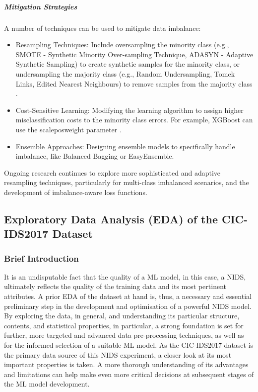 \subparagraph{Mitigation Strategies} 
A number of techniques can be used to mitigate data imbalance:
\begin{itemize}[noitemsep] 
\item Resampling Techniques: Include oversampling the minority class (e.g., SMOTE - Synthetic Minority Over-sampling Technique, ADASYN - Adaptive Synthetic Sampling) to create synthetic samples for the minority class, or undersampling the majority class (e.g., Random Undersampling, Tomek Links, Edited Nearest Neighbours) to remove samples from the majority class \parencite {mahfouz2022systematic}.
\item Cost-Sensitive Learning: Modifying the learning algorithm to assign higher misclassification costs to the minority class errors. For example, XGBoost can use the scale\textunderscore pos\textunderscore weight parameter \parencite{habeeb2024two}.
\item Ensemble Approaches: Designing ensemble models to specifically handle imbalance, like Balanced Bagging or EasyEnsemble.
\end{itemize} 
Ongoing research continues to explore more sophisticated and adaptive resampling techniques, particularly for multi-class imbalanced scenarios, and the development of imbalance-aware loss functions.



\subsection{Exploratory Data Analysis (EDA) of the CIC-IDS2017 Dataset} 

\subsubsection{Brief Introduction} 
It is an undisputable fact that the quality of a ML model, in this case, a NIDS, ultimately reflects the quality of the training data and its most pertinent attributes. A prior EDA of the dataset at hand is, thus, a necessary and essential preliminary step in the development and optimisation of a powerful NIDS model. By exploring the data, in general, and understanding its particular structure, contents, and statistical properties, in particular, a strong foundation is set for further, more targeted and advanced data pre-processing techniques, as well as for the informed selection of a suitable ML model. As the CIC-IDS2017 dataset is the primary data source of this NIDS experiment, a closer look at its most important properties is taken. A more thorough understanding of its advantages and limitations can help make even more critical decisions at subsequent stages of the ML model development.

